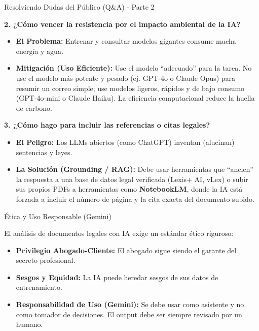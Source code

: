 \documentclass[aspectratio=169]{beamer}
\begin{document}
\begin{frame}{Resolviendo Dudas del Público (Q\&A) - Parte 2}


\textbf{2. ¿Cómo vencer la resistencia por el impacto ambiental de la IA?}
\begin{itemize}
  \item \textbf{El Problema:} Entrenar y consultar modelos gigantes consume mucha energía y agua.
  \item \textbf{Mitigación (Uso Eficiente):} Use el modelo ``adecuado'' para la tarea. No use el modelo más potente y pesado (ej. GPT-4o o Claude Opus) para resumir un correo simple; use modelos ligeros, rápidos y de bajo consumo (GPT-4o-mini o Claude Haiku). La eficiencia computacional reduce la huella de carbono.
\end{itemize}
\textbf{3. ¿Cómo hago para incluir las referencias o citas legales?}
\begin{itemize}
  \item \textbf{El Peligro:} Los LLMs abiertos (como ChatGPT) inventan (alucinan) sentencias y leyes.
  \item \textbf{La Solución (Grounding / RAG):} Debe usar herramientas que ``anclen'' la respuesta a una base de datos legal verificada (Lexis+ AI, vLex) o subir sus propios PDFs a herramientas como \textbf{NotebookLM}, donde la IA está forzada a incluir el número de página y la cita exacta del documento subido.
\end{itemize}
\end{frame}

\begin{frame}{Ética y Uso Responsable (Gemini)}


El análisis de documentos legales con IA exige un estándar ético riguroso:

\begin{itemize}
  \item \textbf{Privilegio Abogado-Cliente:} El abogado sigue siendo el garante del secreto profesional.
  \item \textbf{Sesgos y Equidad:} La IA puede heredar sesgos de sus datos de entrenamiento.
  \item \textbf{Responsabilidad de Uso (Gemini):} Se debe usar como asistente y no como tomador de decisiones. El output debe ser siempre revisado por un humano.
\end{itemize}
\end{frame}
\end{document}
